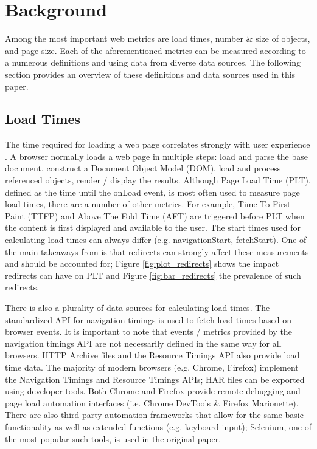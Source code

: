 \section{Background}
\label{sec:background}
Among the most important web metrics are load times, number \& size of objects, and page size. Each of the aforementioned metrics can be measured according to a numerous definitions and using data from diverse data sources. The following section provides an overview of these definitions and data sources used in this paper.

\subsection{Load Times}
The time required for loading a web page correlates strongly with user experience \cite{6263888}. A browser normally loads a web page in multiple steps: load and parse the base document, construct a Document Object Model (DOM), load and process referenced objects, render / display the results. Although Page Load Time (PLT), defined as the time until the onLoad event, is most often used to measure page load times, there are a number of other metrics. For example, Time To First Paint (TTFP) and Above The Fold Time (AFT) are triggered before PLT when the content is first displayed and available to the user. The start times used for calculating load times can always differ (e.g. navigationStart, fetchStart). One of the main takeaways from \cite{10.1007/978-3-030-15986-3_19} is that redirects can strongly affect these measurements and should be accounted for; Figure \ref{fig:plot_redirects} shows the impact redirects can have on PLT and Figure \ref{fig:bar_redirects} the prevalence of such redirects. 

There is also a plurality of data sources for calculating load times. The standardized API for navigation timings \cite{timing_2012} is used to fetch load times based on browser events. It is important to note that events / metrics provided by the navigation timings API are not necessarily defined in the same way for all browsers. HTTP Archive files \cite{har_format_2012} and the Resource Timings API \cite{w3c_2020} also provide load time data. The majority of modern browsers (e.g. Chrome, Firefox) implement the Navigation Timings and Resource Timings APIs; HAR files can be exported using developer tools. Both Chrome and Firefox provide remote debugging and page load automation interfaces (i.e. Chrome DevTools \& Firefox Marionette). There are also third-party automation frameworks that allow for the same basic functionality as well as extended functions (e.g. keyboard input); Selenium, one of the most popular such tools, is used in the original paper.

